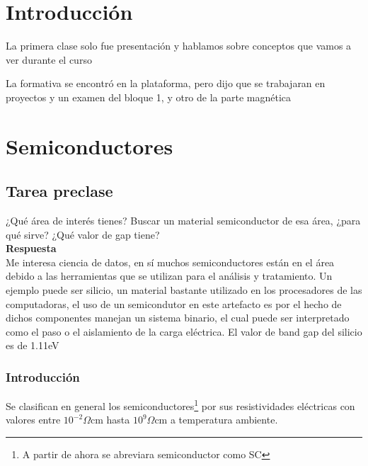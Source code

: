\documentclass[11pt]{report}
\theoremstyle{plain}
\theoremstyle{definition}
\begin{document}

\tableofcontents


\chapter{Introducción}
La primera clase solo fue presentación y hablamos sobre conceptos que vamos a ver durante el curso

La formativa se encontró en la plataforma, pero dijo que se trabajaran en proyectos y un examen del bloque 1, y otro de la parte magnética
\chapter{Semiconductores}

\section{Tarea preclase}
¿Qué área de interés tienes? Buscar un material semiconductor de esa área, ¿para qué sirve? ¿Qué valor de gap tiene?\\

\textbf{Respuesta}\\

Me interesa ciencia de datos, en sí muchos semiconductores están en el área debido a las herramientas que se utilizan para el análisis y tratamiento. Un ejemplo puede ser silicio, un material bastante utilizado en los procesadores de las computadoras, el uso de un semicondutor en este artefacto es por el hecho de dichos componentes manejan un sistema binario, el cual puede ser interpretado como el paso o el aislamiento de la carga eléctrica. El valor de band gap del silicio es de 1.11eV




\subsection{Introducción}

Se clasifican en general los semiconductores\footnote{A partir de ahora se abreviara semiconductor como SC} por sus resistividades eléctricas con valores entre $10^{-2}\Omega$cm hasta $10^{9}\Omega$cm a temperatura ambiente.
\end{document}
